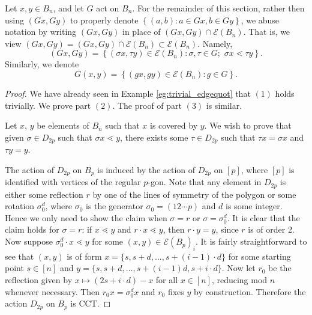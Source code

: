 \documentclass[smallextended, envcountsame, numbook]{svjour3}
\theoremstyle{plain}
\theoremstyle{definition}
\theoremstyle{remark}
\numberwithin{equation}{section}
\begin{document}
Let $x, y \in B_n$, and let $G$ act on $B_n$. For the remainder of this section, rather then using $(Gx, Gy)$ to properly denote $\left\{ (a,b): a \in Gx, b \in Gy \right\}$,
we abuse notation by writing $(Gx, Gy)$ in place of $(Gx, Gy) \cap  \mathcal E(B_n)$.  That is, we view $(Gx, Gy) = (Gx, Gy) \cap  \mathcal E(B_n)\subset  \mathcal E(B_n)$. Namely, $$(Gx, Gy) = \left\{ (\sigma x, \tau y) \in  \mathcal E (B_n) : \sigma, \tau \in G; \, \, \sigma x \lessdot \tau y  \right\}.$$ Similarly, we denote $$G(x, y) = \left\{ (gx , g y) \in  \mathcal E (B_n) \colon g \in G \right\}.$$

\building*

\begin{proof}
We have already seen in Example \ref{eg:trivial_edgequot} that $(1)$ holds trivially. We prove part $(2)$. The proof of part $(3)$ is similar. 

Let $x$, $y$ be elements of $B_n$ such that $x$ is covered by $y$.  We wish to prove that given $\sigma \in D_{2p}$ such that $\sigma x \lessdot y$, there exists some $\tau \in D_{2p}$ such that $\tau x = \sigma x$ and $\tau y = y$. 

The action of $D_{2p}$ on $B_p$ is induced by the action of $D_{2p}$ on $[p]$, where $[p]$ is identified with vertices of the regular $p$-gon. Note that any element in $D_{2p}$ is either some reflection $r$ by one of the lines of symmetry of the polygon or some rotation $\sigma_0^{d}$, where $\sigma_0$ is the generator $\sigma_0 = (12 \cdots p)$ and $d$ is some integer. Hence we only need to show the claim when $\sigma = r$ or $\sigma = \sigma_0^d$. It is clear that the claim holds for $\sigma = r$: if $x \lessdot y$ and $r \cdot x \lessdot y$, then $r \cdot y = y$, since $r$ is of order 2. Now suppose $\sigma_0^d \cdot x \lessdot y$ for some $(x,y) \in \mathcal E(B_p)_i$.  It is fairly straightforward to see that $(x, y)$ is of form $x = \{s, s+d, ..., s+(i-1)\cdot d\}$ for some starting point $s \in [n]$ and $y = \{s, s+d, ..., s+(i-1)d, s + i \cdot d\}$. Now let $r_0$ be the reflection given by $x \mapsto (2s+ i \cdot d)-x$ for all $x \in [n]$, reducing mod $n$ whenever necessary. Then $r_0 x = \sigma_0^d x$ and $r_0$ fixes $y$ by construction.  Therefore the action $D_{2p}$ on $B_p$ is CCT. 
\end{proof}
\end{document}
